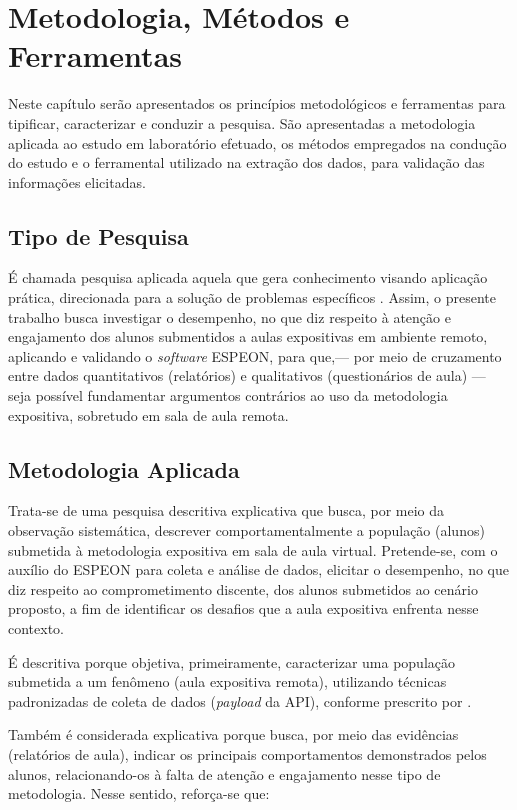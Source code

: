 \chapter{Metodologia, Métodos e Ferramentas} \label{chp:methodology}
Neste capítulo serão apresentados os princípios metodológicos e ferramentas para tipificar, caracterizar e conduzir a pesquisa. São apresentadas a metodologia aplicada ao estudo em laboratório efetuado, os métodos empregados na condução do estudo e o ferramental utilizado na extração dos dados, para validação das informações elicitadas.

\section{Tipo de Pesquisa}\label{sec:research_kind}
É chamada pesquisa aplicada aquela que gera conhecimento visando aplicação prática, direcionada para a solução de problemas específicos \cite{sienaMetodologiaPesquisaCientifica2024}. Assim, o presente trabalho busca investigar o desempenho, no que diz respeito à atenção e engajamento dos alunos submentidos a aulas expositivas em ambiente remoto, aplicando e validando o \textit{software} ESPEON, para que,--- por meio de cruzamento entre dados quantitativos (relatórios) e qualitativos (questionários de aula) --- seja possível fundamentar argumentos contrários ao uso da metodologia expositiva, sobretudo em sala de aula remota.

\section{Metodologia Aplicada}\label{sec:applied_methodology}
Trata-se de uma pesquisa descritiva explicativa que busca, por meio da observação sistemática, descrever comportamentalmente a população (alunos) submetida à metodologia expositiva em sala de aula virtual. Pretende-se, com o auxílio do ESPEON para coleta e análise de dados, elicitar o desempenho, no que diz respeito ao comprometimento discente, dos alunos submetidos ao cenário proposto, a fim de identificar os desafios que a aula expositiva enfrenta nesse contexto.

É descritiva porque objetiva, primeiramente, caracterizar uma população submetida a um fenômeno (aula expositiva remota), utilizando técnicas padronizadas de coleta de dados (\textit{payload} da API), conforme prescrito por \cite{gilComoElaborarProjetos2008a}.

Também é considerada explicativa porque busca, por meio das evidências (relatórios de aula), indicar os principais comportamentos demonstrados pelos alunos, relacionando-os à falta de atenção e engajamento nesse tipo de metodologia. Nesse sentido, reforça-se que:

